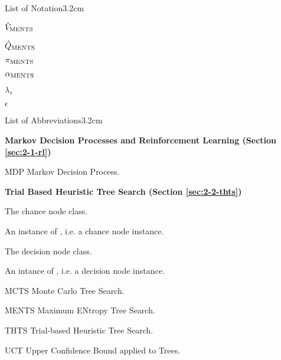 \begin{mclistof}{List of Notation}{3.2cm}
    \item[$\hat{V}_{\textnormal{MENTS}}$] 
    \item[$\hat{Q}_{\textnormal{MENTS}}$] 
    \item[$\pi_{\textnormal{MENTS}}$] 
    \item[$\alpha_{\textnormal{MENTS}}$] 
    \item[$\lambda_s$] 
    \item[$\epsilon$] 

\end{mclistof} 

\begin{mclistof}{List of Abbreviations}{3.2cm}

    
    \item[\Large\textbf{Markov Decision Processes and Reinforcement Learning (Section \ref{sec:2-1-rl})}\hfill\hfill]
    \item[MDP] Markov Decision Process.
    \\
    \item[\Large\textbf{Trial Based Heuristic Tree Search (Section \ref{sec:2-2-thts})}\hfill\hfill] 
    \item[\CNODE] 
        The chance node class.
    \item[\cnode] 
        An instance of \CNODE, i.e. a chance node instance.
    \item[\DNODE] 
        The decision node class.
    \item[\dnode] 
        An intance of \DNODE, i.e. a decision node instance.
    \item[MCTS] 
        Monte Carlo Tree Search.
    \item[MENTS]
        Maximum ENtropy Tree Search.
    \item[THTS] 
        Trial-based Heuristic Tree Search.
    \item[\thtspp] 
    \item[UCT] 
        Upper Confidence Bound applied to Trees.
    

\end{mclistof} 
